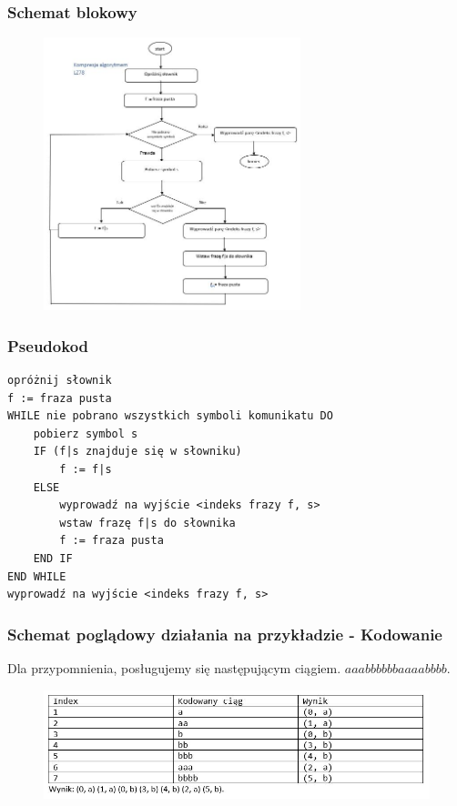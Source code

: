 \documentclass{article}
\begin{document}
\subsubsection{Schemat blokowy}
\begin{figure}[h!]
\centering
\includegraphics[height=300px]{img/schemat_lz78.JPG}
\end{figure}

\newpage
\subsubsection{Pseudokod}
\begin{verbatim}
opróżnij słownik
f := fraza pusta
WHILE nie pobrano wszystkich symboli komunikatu DO  
    pobierz symbol s
    IF (f|s znajduje się w słowniku)
        f := f|s
    ELSE
        wyprowadź na wyjście <indeks frazy f, s>  
        wstaw frazę f|s do słownika 
        f := fraza pusta
    END IF
END WHILE
wyprowadź na wyjście <indeks frazy f, s>
\end{verbatim}

\subsubsection{Schemat poglądowy działania na przykładzie - Kodowanie}
Dla przypomnienia, posługujemy się następującym ciągiem. $aaabbbbbbaaaabbbb$.

\begin{figure}[h!]
\centering
\includegraphics{img/lz78_1.JPG}
\end{figure}
\end{document}
